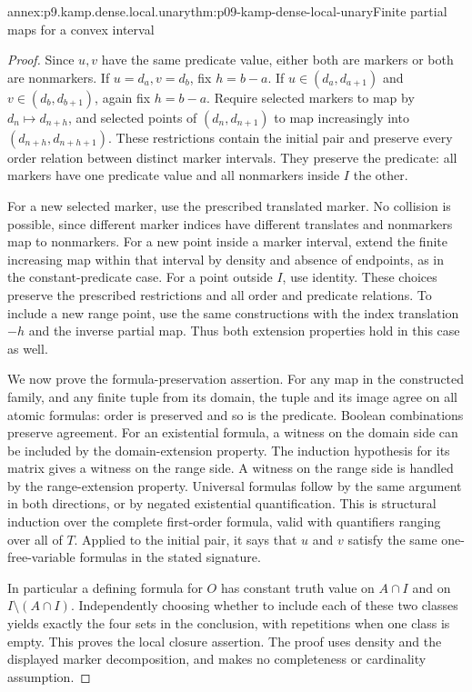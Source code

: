 \begin{annexitem}{annex:p9.kamp.dense.local.unary}{thm:p09-kamp-dense-local-unary}{Finite partial maps for a convex interval}
\begin{proof}
Since \(u,v\) have the same predicate value, either both
are markers or both are nonmarkers. If \(u=d_a,v=d_b\),
fix \(h=b-a\). If \(u\in(d_a,d_{a+1})\) and
\(v\in(d_b,d_{b+1})\), again fix \(h=b-a\).
Require selected markers to map by
\(d_n\mapsto d_{n+h}\), and selected points of
\((d_n,d_{n+1})\) to map increasingly into
\((d_{n+h},d_{n+h+1})\). These restrictions contain the
initial pair and preserve every order relation between distinct
marker intervals. They preserve the predicate: all markers have
one predicate value and all nonmarkers inside \(I\) the other.

For a new selected marker, use the prescribed translated marker.
No collision is possible, since different marker indices have
different translates and nonmarkers map to nonmarkers. For a
new point inside a marker interval, extend the finite increasing
map within that interval by density and absence of endpoints,
as in the constant-predicate case. For a point outside \(I\),
use identity. These choices preserve the prescribed restrictions
and all order and predicate relations. To include a new range
point, use the same constructions with the index translation
\(-h\) and the inverse partial map. Thus both extension
properties hold in this case as well.

We now prove the formula-preservation assertion. For any map in
the constructed family, and any finite tuple from its domain,
the tuple and its image agree on all atomic formulas: order is
preserved and so is the predicate. Boolean combinations preserve
agreement. For an existential formula, a witness on the domain
side can be included by the domain-extension property. The
induction hypothesis for its matrix gives a witness on the
range side. A witness on the range side is handled by the
range-extension property. Universal formulas follow by the
same argument in both directions, or by negated existential
quantification. This is structural induction over the complete
first-order formula, valid with quantifiers ranging over all
of \(T\). Applied to the initial pair, it says that \(u\)
and \(v\) satisfy the same one-free-variable formulas in
the stated signature.

In particular a defining formula for \(O\) has constant
truth value on \(A\cap I\) and on
\(I\setminus(A\cap I)\). Independently choosing whether
to include each of these two classes yields exactly the four
sets in the conclusion, with repetitions when one class is
empty. This proves the local closure assertion. The proof
uses density and the displayed marker decomposition, and makes
no completeness or cardinality assumption.
\end{proof}
\end{annexitem}

